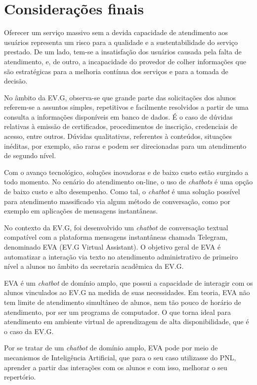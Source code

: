 \chapter{Considerações finais}

Oferecer um serviço massivo sem a devida capacidade de atendimento aos usuários representa um risco para a qualidade e a sustentabilidade do serviço prestado. De um lado, tem-se a insatisfação dos usuários causada pela falta de atendimento, e, de outro, a incapacidade do provedor de colher informações que são estratégicas para a melhoria contínua dos serviços e para a tomada de decisão.

No âmbito da EV.G, observa-se que grande parte das solicitações dos alunos referem-se a assuntos simples, repetitivos e facilmente resolvidos a partir de uma consulta a informações disponíveis em banco de dados. É o caso de dúvidas relativas à emissão de certificados, procedimentos de inscrição, credenciais de acesso, entre outros. Dúvidas qualitativas, referentes à conteúdos, situações inéditas, por exemplo, são raras e podem ser direcionadas para um atendimento de segundo nível.  

Com o avanço tecnológico, soluções inovadoras e de baixo custo estão surgindo a todo momento. No cenário do atendimento on-line, o uso de \textit{chatbots} é uma opção de baixo custo e alto desempenho. Como tal, o \textit{chatbot} é uma solução possível para atendimento massificado via algum método de conversação, como por exemplo em aplicações de mensagens instantâneas.

No contexto da EV.G, foi desenvolvido um \textit{chatbot} de conversação textual compatível com a plataforma mensagens instantâneas chamada Telegram, denominado EVA (EV.G Virtual Assistant). O objetivo geral de EVA é automatizar a interação via texto no atendimento administrativo de primeiro nível a alunos no âmbito da secretaria acadêmica da EV.G.

EVA é um \textit{chatbot} de domínio amplo, que possui a capacidade de interagir com os alunos vinculados ao EV.G na medida de suas necessidades. Em teoria, EVA não tem limite de atendimento simultâneo de alunos, nem tão pouco de horário de atendimento, por ser um programa de computador. O que torna ideal para atendimento em ambiente virtual de aprendizagem de alta disponibilidade, que é o caso da EV.G.

Por se tratar de um \textit{chatbot} de domínio amplo, EVA pode por meio de mecanismos de Inteligência Artificial, que para o seu caso utilizasse do PNL, aprender a partir das interações com os alunos e com isso, melhorar o seu repertório.

